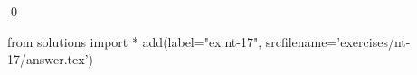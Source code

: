 
\begin{ex} 
  \label{ex:nt-17}
  
  \qed
\end{ex} 
\begin{python0}
from solutions import *
add(label="ex:nt-17",
    srcfilename='exercises/nt-17/answer.tex') 
\end{python0}
